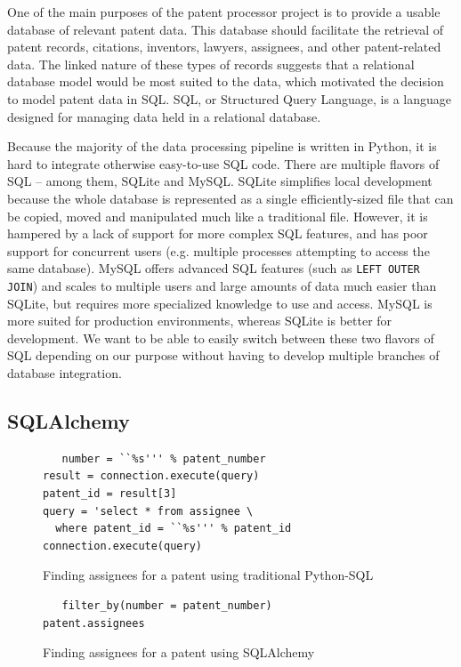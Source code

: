 One of the main purposes of the patent processor project is to provide
a usable database of relevant patent data. This database should facilitate
the retrieval of patent records, citations, inventors, lawyers, assignees,
and other patent-related data. The linked nature of these types of
records suggests that a relational database model would be most suited
to the data, which motivated the decision to model patent data in
SQL. SQL, or Structured Query Language, is a language designed for
managing data held in a relational database.

Because the majority of the data processing pipeline is written in
Python, it is hard to integrate otherwise easy-to-use SQL code. There
are multiple flavors of SQL -- among them, SQLite and MySQL. SQLite
simplifies local development because the whole database is represented
as a single efficiently-sized file that can be copied, moved and manipulated
much like a traditional file. However, it is hampered by a lack of
support for more complex SQL features, and has poor support for concurrent
users (e.g. multiple processes attempting to access the same database).
MySQL offers advanced SQL features (such as \verb`LEFT OUTER JOIN`)
and scales to multiple users and large amounts of data much easier
than SQLite, but requires more specialized knowledge to use and access.
MySQL is more suited for production environments, whereas SQLite is
better for development. We want to be able to easily switch between
these two flavors of SQL depending on our purpose without having to
develop multiple branches of database integration.


\subsection{SQLAlchemy}

\begin{figure}
\begin{lstlisting}
   number = ``%s''' % patent_number
result = connection.execute(query)
patent_id = result[3]
query = 'select * from assignee \
  where patent_id = ``%s''' % patent_id
connection.execute(query)
\end{lstlisting}
 \label{fig:sql-assignee} \caption{Finding assignees for a patent using traditional Python-SQL}
\end{figure}


\begin{figure}
\begin{lstlisting}
   filter_by(number = patent_number)
patent.assignees
\end{lstlisting}
 \label{fig:sa-assignee} \caption{Finding assignees for a patent using SQLAlchemy}
\end{figure}



